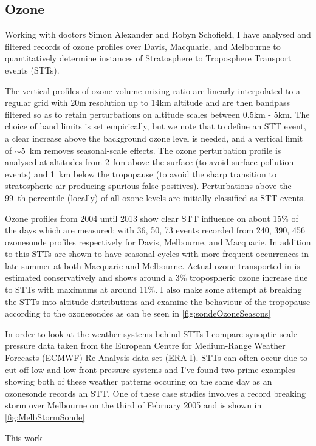\subsection{Ozone}
Working with doctors Simon Alexander and Robyn Schofield, I have analysed and filtered records of ozone profiles over Davis, Macquarie, and Melbourne to quantitatively determine instances of Stratosphere to Troposphere Transport events (STTs).

The vertical profiles of ozone volume mixing ratio are linearly interpolated to a regular grid with 20m resolution up to 14km altitude and are then bandpass filtered so as to retain perturbations on altitude scales between 0.5km - 5km. The choice of band limits is set empirically, but we note that to define an STT event, a clear increase above the background ozone level is needed, and a vertical limit of $\sim 5$~km removes seasonal-scale effects. 
The ozone perturbation profile is analysed at altitudes from 2~km above the surface (to avoid surface pollution events) and 1~km below the tropopause (to avoid the sharp transition to stratospheric air producing spurious false positives). Perturbations above the 99~th percentile (locally) of all ozone levels are initially classified as STT events.

Ozone profiles from 2004 until 2013 show clear STT influence on about 15\% of the days which are measured: with 36, 50, 73 events recorded from 240, 390, 456 ozonesonde profiles respectively for Davis, Melbourne, and Macquarie.
In addition to this STTs are shown to have seasonal cycles with more frequent occurrences in late summer at both Macquarie and Melbourne.
Actual ozone transported in is estimated conservatively and shows around a 3\% tropospheric ozone increase due to STTs with maximums at around 11\%.
I also make some attempt at breaking the STTs into altitude distributions and examine the behaviour of the tropopause according to the ozonesondes as can be seen in \ref{fig:sondeOzoneSeasons}

In order to look at the weather systems behind STTs I compare synoptic scale pressure data taken from the European Centre for Medium-Range Weather Forecasts (ECMWF) Re-Analysis data set (ERA-I).
STTs can often occur due to cut-off low and low front pressure systems and I've found two prime examples showing both of these weather patterns occuring on the same day as an ozonesonde records an STT.
One of these case studies involves a record breaking storm over Melbourne on the third of February 2005 and is shown in \ref{fig:MelbStormSonde}

This work 